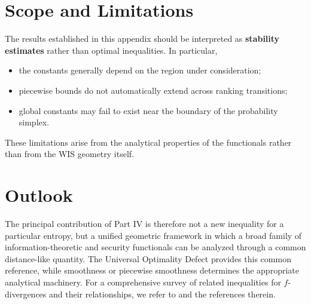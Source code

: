 \section{Scope and Limitations}
The results established in this appendix should be interpreted as
\textbf{stability estimates} rather than optimal inequalities.
In particular,
\begin{itemize}
\item the constants generally depend on the region under consideration;
\item piecewise bounds do not automatically extend across ranking transitions;
\item global constants may fail to exist near the boundary of the probability simplex.
\end{itemize}
These limitations arise from the analytical properties of the
functionals rather than from the WIS geometry itself.
\section{Outlook}
The principal contribution of Part IV is therefore not a new
inequality for a particular entropy, but a unified geometric framework
in which a broad family of information-theoretic and security
functionals can be analyzed through a common distance-like quantity.
The Universal Optimality Defect provides this common reference, while
smoothness or piecewise smoothness determines the appropriate analytical
machinery.
For a comprehensive survey of related inequalities for
\(f\)-divergences and their relationships, we refer to
\cite{sason2016fdivergence} and the references therein.
